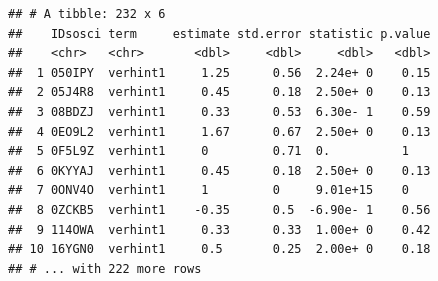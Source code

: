 \documentclass[
]{book}
\newenvironment{Shaded}{\begin{snugshade}}{\end{snugshade}}
\newcommand{\CommentTok}[1]{\textcolor[rgb]{0.56,0.35,0.01}{\textit{#1}}}
\newcommand{\DataTypeTok}[1]{\textcolor[rgb]{0.13,0.29,0.53}{#1}}
\newcommand{\DecValTok}[1]{\textcolor[rgb]{0.00,0.00,0.81}{#1}}
\newcommand{\KeywordTok}[1]{\textcolor[rgb]{0.13,0.29,0.53}{\textbf{#1}}}
\newcommand{\NormalTok}[1]{#1}
\newcommand{\OperatorTok}[1]{\textcolor[rgb]{0.81,0.36,0.00}{\textbf{#1}}}
\newcommand{\OtherTok}[1]{\textcolor[rgb]{0.56,0.35,0.01}{#1}}
\newcommand{\StringTok}[1]{\textcolor[rgb]{0.31,0.60,0.02}{#1}}
\begin{document}
\begin{Shaded}
\end{Shaded}

\begin{verbatim}
## # A tibble: 232 x 6
##    IDsosci term     estimate std.error statistic p.value
##    <chr>   <chr>       <dbl>     <dbl>     <dbl>   <dbl>
##  1 050IPY  verhint1     1.25      0.56  2.24e+ 0    0.15
##  2 05J4R8  verhint1     0.45      0.18  2.50e+ 0    0.13
##  3 08BDZJ  verhint1     0.33      0.53  6.30e- 1    0.59
##  4 0EO9L2  verhint1     1.67      0.67  2.50e+ 0    0.13
##  5 0F5L9Z  verhint1     0         0.71  0.          1   
##  6 0KYYAJ  verhint1     0.45      0.18  2.50e+ 0    0.13
##  7 0ONV4O  verhint1     1         0     9.01e+15    0   
##  8 0ZCKB5  verhint1    -0.35      0.5  -6.90e- 1    0.56
##  9 114OWA  verhint1     0.33      0.33  1.00e+ 0    0.42
## 10 16YGN0  verhint1     0.5       0.25  2.00e+ 0    0.18
## # ... with 222 more rows
\end{verbatim}
\end{document}
